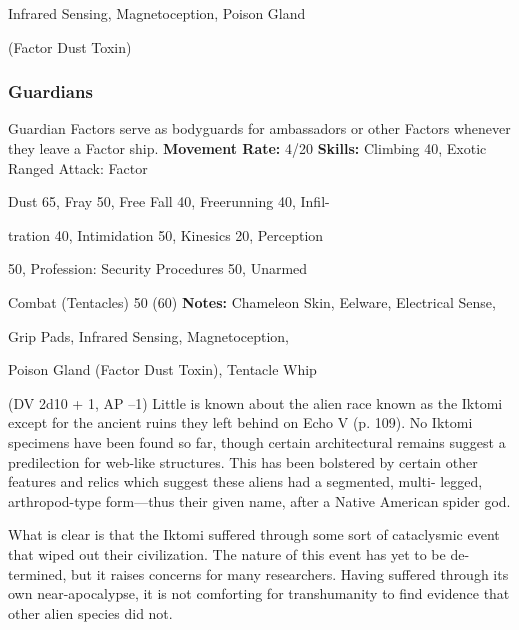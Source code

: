 Infrared Sensing, Magnetoception, Poison Gland 

(Factor Dust Toxin)

\subsubsection{Guardians}

Guardian Factors serve as bodyguards for ambassadors 
or other Factors whenever they leave a Factor ship.
\textbf{Movement Rate: }4/20\textbf{ }
\textbf{Skills:} Climbing 40, Exotic Ranged Attack: Factor 

Dust 65, Fray 50, Free Fall 40, Freerunning 40, Infil-

tration 40, Intimidation 50, Kinesics 20, Perception 

50, Profession: Security Procedures 50, Unarmed 

Combat (Tentacles) 50 (60)
\textbf{Notes:} Chameleon Skin, Eelware, Electrical Sense, 

Grip Pads, Infrared Sensing, Magnetoception, 

Poison Gland (Factor Dust Toxin), Tentacle Whip 

(DV 2d10 + 1, AP –1)
Little is known about the alien race known as the 
Iktomi except for the ancient ruins they left behind 
on Echo V (p. 109). No Iktomi specimens have been 
found so far, though certain architectural remains 
suggest a predilection for web-like structures. This 
has been bolstered by certain other features and relics 
which suggest these aliens had a segmented, multi-
legged, arthropod-type form—thus their given name, 
after a Native American spider god.

What is clear is that the Iktomi suffered through 
some sort of cataclysmic event that wiped out their 
civilization. The nature of this event has yet to be de-
termined, but it raises concerns for many researchers. 
Having suffered through its own near-apocalypse, it 
is not comforting for transhumanity to find evidence 
that other alien species did not.

